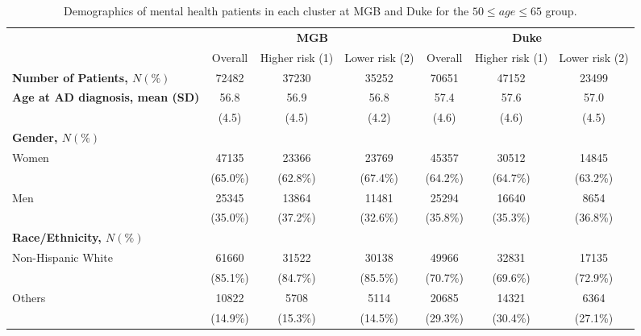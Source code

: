 \documentclass{article}
\begin{document}
\begin{table}[H]
    \centering
    \scriptsize
    \begin{tabular}{l c c c c c c}
\toprule
& \multicolumn{3}{c}{\textbf{MGB}}&
\multicolumn{3}{c}{\textbf{Duke}}\\
\cmidrule(r){2-4}\cmidrule(l){5-7}
& Overall & Higher risk (1) & Lower risk (2) & Overall & Higher risk (1) & Lower risk (2)  \\
\bottomrule
\textbf{Number of Patients, $N(\%)$} & 72482 & 37230 & 35252 & 70651 & 47152 & 23499 \\
\bottomrule
\textbf{Age at AD diagnosis, mean (SD)} & 56.8 & 56.9 & 56.8 & 57.4 & 57.6 & 57.0 \\
 & (4.5) & (4.5) & (4.2) & (4.6) & (4.6) & (4.5)\\
\bottomrule
\textbf{Gender, $N(\%)$}\\
Women & 47135 & 23366 & 23769 & 45357 & 30512 & 14845 \\
 & (65.0\%) & (62.8\%) & (67.4\%) & (64.2\%) & (64.7\%) & (63.2\%) \\
Men & 25345 & 13864 & 11481 & 25294 & 16640 & 8654 \\
 & (35.0\%) & (37.2\%) & (32.6\%) & (35.8\%) & (35.3\%) & (36.8\%) \\
\bottomrule
\textbf{Race/Ethnicity, $N(\%)$} \\
Non-Hispanic White & 61660 & 31522 & 30138 & 49966 & 32831 & 17135 \\
 & (85.1\%) & (84.7\%) & (85.5\%) & (70.7\%) & (69.6\%) & (72.9\%) \\
Others & 10822 & 5708 & 5114 & 20685 & 14321 & 6364 \\
 & (14.9\%) & (15.3\%) & (14.5\%) & (29.3\%) & (30.4\%) & (27.1\%) \\
\bottomrule
\end{tabular}
\caption{Demographics of mental health patients in each cluster at MGB and Duke for the $50\le age \le 65$ group.}
\label{tab:mental_demo_50-65}
\end{table}
\end{document}
